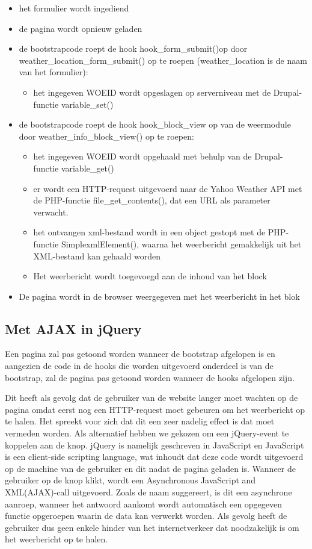 \begin{itemize}
	\item het formulier wordt ingediend
	\item de pagina wordt opnieuw geladen
	\item de bootstrapcode roept de hook hook\_form\_submit()op door weather\_location\_form\_submit() op te roepen (weather\_location is de naam van het formulier):
	\begin{itemize}
		\item het ingegeven WOEID wordt opgeslagen op serverniveau met de Drupal-functie variable\_set()
	\end{itemize}
	\item de bootstrapcode roept de hook hook\_block\_view op van de weermodule door weather\_info\_block\_view() op te roepen:
	\begin{itemize}
		\item het ingegeven WOEID wordt opgehaald met behulp van de Drupal-functie variable\_get()
		\item er wordt een HTTP-request uitgevoerd naar de Yahoo Weather API met de PHP-functie file\_get\_contents(), dat een URL als parameter verwacht.
		\item het ontvangen xml-bestand wordt in een object gestopt met de PHP-functie SimplexmlElement(), waarna het weerbericht gemakkelijk uit het XML-bestand kan gehaald worden
		\item Het weerbericht wordt toegevoegd aan de inhoud van het block
	\end{itemize}
	\item De pagina wordt in de browser weergegeven met het weerbericht in het blok
\end{itemize}

\subsection{Met AJAX in jQuery}

Een pagina zal pas getoond worden wanneer de bootstrap afgelopen is en aangezien de code in de hooks die worden uitgevoerd onderdeel is van de bootstrap, zal de pagina pas getoond worden wanneer de hooks afgelopen zijn.

Dit heeft als gevolg dat de gebruiker van de website langer moet wachten op de pagina omdat eerst nog een HTTP-request moet gebeuren om het weerbericht op te halen.
Het spreekt voor zich dat dit een zeer nadelig effect is dat moet vermeden worden.
Als alternatief hebben we gekozen om een jQuery-event te koppelen aan de knop.
jQuery is namelijk geschreven in JavaScript en JavaScript is een client-side scripting language, wat inhoudt dat deze code wordt uitgevoerd op de machine van de gebruiker en dit nadat de pagina geladen is.
Wanneer de gebruiker op de knop klikt, wordt een Asynchronous JavaScript and XML(AJAX)-call uitgevoerd.
Zoals de naam suggereert, is dit een asynchrone aanroep, wanneer het antwoord aankomt wordt automatisch een opgegeven functie opgeroepen waarin de data kan verwerkt worden.
Als gevolg heeft de gebruiker dus geen enkele hinder van het internetverkeer dat noodzakelijk is om het weerbericht op te halen.



